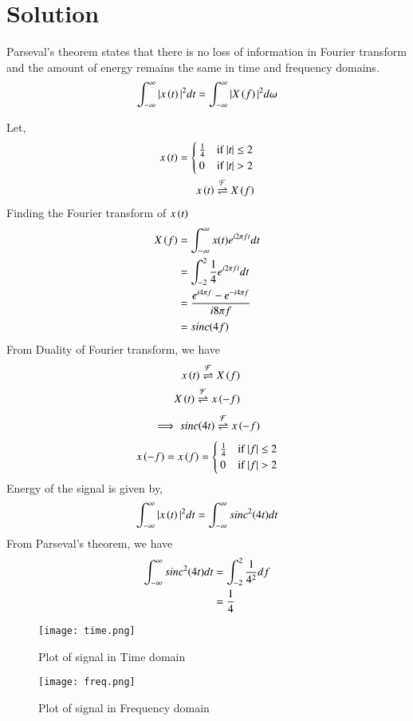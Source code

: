 \documentclass[journal,12pt,twocolumn]{IEEEtran}
\begin{document}
\section{Solution}
\begin{lemma}
Parseval's theorem states that there is no loss of information in Fourier transform and the amount of energy remains the same in time and frequency domains.
\begin{align}
    \int_{-\infty}^{\infty} |x\left(t\right)|^{2} dt = \int_{-\infty}^{\infty} |X\left(f\right)|^{2} d\omega
\end{align}
\end{lemma}
Let,
\begin{align}
x\left(t\right) =
    \begin{cases}
    \frac{1}{4} & \text{if } |t| \leq 2\\
    0 & \text{if } |t| > 2
    \end{cases}\\
    x\left(t\right) \overset{\mathcal{F}}{ \rightleftharpoons}{X} \left(f\right)
\end{align}
Finding the Fourier transform of $x\left(t\right)$
\begin{align}
    X\left(f\right) &= \int_{-\infty}^{\infty} x(t)e^{i2\pi ft}dt\\
    &= \int_{-2}^{2}\frac{1}{4}e^{i2\pi ft}dt\\
    &= \frac{e^{i4\pi f} - e^{-i4\pi f}}{i8\pi f}\\
    &= sinc{\left(4f\right)}
\end{align}
From Duality of Fourier transform, we have
\begin{align}
    x\left(t\right) \overset{\mathcal{F}}{ \rightleftharpoons}{X} \left(f\right)\\
    X\left(t\right) \overset{\mathcal{F}}{ \rightleftharpoons}{x} \left(-f\right)
\end{align}
\begin{align}
    \implies sinc{\left(4t\right)} \overset{\mathcal{F}}{ \rightleftharpoons} x\left(-f\right) 
\end{align}
\begin{align}
    x\left(-f\right) = x\left(f\right) = 
    \begin{cases}
    \frac{1}{4} & \text{if } |f| \leq 2\\
    0 & \text{if } |f| > 2
    \end{cases}
\end{align}
Energy of the signal is given by,
\begin{align}
    \int_{-\infty}^{\infty} |x\left(t\right)|^{2} dt = \int_{-\infty}^{\infty} sinc^2{\left(4t\right)}  dt
\end{align}
From Parseval's theorem, we have
\begin{align}
    \int_{-\infty}^{\infty} sinc^2{\left(4t\right)}  dt &= \int_{-2}^{2} \frac{1}{4^{2}} df\\
    &= \frac{1}{4}
\end{align}
\begin{figure}[h!]
\centering
\texttt{[image: time.png]}
\caption{Plot of signal in Time domain}
\label{fig:sig_time}
\end{figure}
\begin{figure}[h!]
\centering
\texttt{[image: freq.png]}
\caption{Plot of signal in Frequency domain}
\label{fig:sig_freq}
\end{figure}
\end{document}
